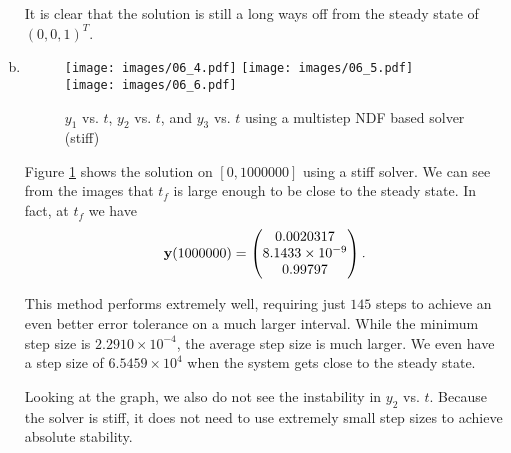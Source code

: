 \begin{solution}
\begin{enumerate}[(a)]
    It is clear that the solution is still a long ways off from the steady state of $(0,0,1)^T$.
    \FloatBarrier
    
    \item
    \begin{figure}[h!]
      \centering
      \texttt{[image: images/06\_4.pdf]}
      \texttt{[image: images/06\_5.pdf]}
      \texttt{[image: images/06\_6.pdf]}
      \caption{$y_1$ vs. $t$, $y_2$ vs. $t$, and $y_3$ vs. $t$ using a multistep NDF based solver (stiff)}
      \label{F:06_2}
    \end{figure}
    
    Figure \ref{F:06_2} shows the solution on $[0,1000000]$ using a stiff solver. We can see from the images that $t_f$ is large enough to be close to the steady state. In fact, at $t_f$ we have
    \[
      \mathbf{y}(1000000) = \begin{pmatrix}
        0.0020317 \\
        8.1433 \times 10^{-9} \\
        0.99797
      \end{pmatrix}.
    \]
    
    This method performs extremely well, requiring just $145$ steps to achieve an even better error tolerance on a much larger interval. While the minimum step size is $2.2910 \times 10^{-4}$, the average step size is much larger. We even have a step size of $6.5459 \times 10^{4}$ when the system gets close to the steady state.
    
    Looking at the graph, we also do not see the instability in $y_2$ vs. $t$. Because the solver is stiff, it does not need to use extremely small step sizes to achieve absolute stability.
  \end{enumerate}
\end{solution}